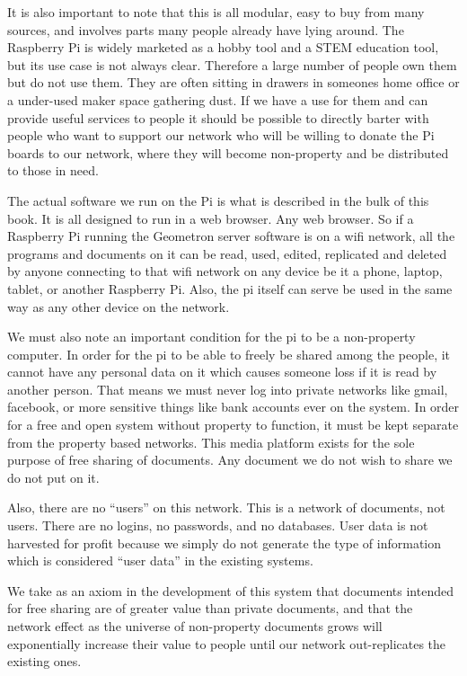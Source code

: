 It is also important to note that this is all modular, easy to buy from many sources, and involves parts many people already have lying around.  The Raspberry Pi is widely marketed as a hobby tool and a STEM education tool, but its use case is not always clear.  Therefore a large number of people own them but do not use them.  They are often sitting in drawers in someones home office or a under-used maker space gathering dust.  If we have a use for them and can provide useful services to people it should be possible to directly barter with people who want to support our network who will be willing to donate the Pi boards to our network, where they will become non-property and be distributed to those in need.

The actual software we run on the Pi is what is described in the bulk of this book.  It is all designed to run in a web browser. Any web browser.  So if a Raspberry Pi running the Geometron server software is on a wifi network, all the programs and documents on it can be read, used, edited, replicated and deleted by anyone connecting to that wifi network on any device be it a phone, laptop, tablet, or another Raspberry Pi.  Also, the pi itself can serve be used in the same way as any other device on the network.  

We must also note an important condition for the pi to be a non-property computer.  In order for the pi to be able to freely be shared among the people, it cannot have any personal data on it which causes someone loss if it is read by another person.  That means we must never log into private networks like gmail, facebook, or more sensitive things like bank accounts ever on the system.  In order for a free and open system without property to function, it must be kept separate from the property based networks.  This media platform exists for the sole purpose of free sharing of documents.  Any document we do not wish to share we do not put on it. 

Also, there are no ``users'' on this network.  This is a network of documents, not users.  There are no logins, no passwords, and no databases.  User data is not harvested for profit because we simply do not generate the type of information which is considered ``user data'' in the existing systems.  

We take as an axiom in the development of this system that documents intended for free sharing are of greater value than private documents, and that the network effect as the universe of non-property documents grows will exponentially increase their value to people until our network out-replicates the existing ones.

